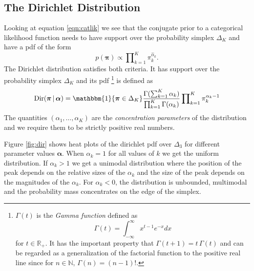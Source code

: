 \documentclass[final,3p,times,twocolumn]{elsarticle}
\DeclareMathOperator*{\Dir}{Dir}
\let\bs\boldsymbol
\begin{document}
\subsection{The Dirichlet Distribution}
\label{sect:dirdistro}
Looking at equation \ref{eqn:catlik} we see that the conjugate prior to a categorical likelihood function needs to have support over the probability simplex $\Delta_K$ and have a pdf of the form 
\begin{equation}
p(\bs \pi) \propto \prod\nolimits_{k=1}^K \pi_k^{\hat\alpha_k}.
\end{equation}
The Dirichlet distribution satisfies both criteria. 
It has support over the probability simplex $\Delta_K$ and its pdf
\footnote{
$\Gamma(t)$ is the \emph{Gamma function} defined as 
\[
\Gamma(t) = \int\nolimits_{-\infty}^{\infty} x^{t-1} e^{-x} dx
\]	
for $t \in \mathbb{R}_+$.
It has the important property that $\Gamma(t+1) = t\,\Gamma(t)$ and can be regarded as a generalization of the factorial function to the positive real line since for $n\in \mathbb{N}$, $\Gamma(n) = (n-1)!$.
}
is defined as
\begin{equation}
\label{eqn:dirpdf}
\Dir(\bs \pi\,|\,\bs \alpha) = \mathbbm{1}\{\bs \pi \in \Delta_K\}\frac{\Gamma(\sum_{k=1}^K\alpha_k)}{\prod_{k=1}^K\Gamma(\alpha_k)}\prod\nolimits_{k=1}^K\pi_k^{\alpha_k - 1} 
\end{equation}
The quantities $(\alpha_1,\dots,\alpha_K)$ are the \emph{concentration parameters} of the distribution and we require them to be strictly positive real numbers. 

Figure \ref{fig:dir} shows heat plots of the dirichlet pdf over $\Delta_3$ for different parameter values $\bs \alpha$.
When $\alpha_k = 1$ for all values of $k$ we get the uniform distribution.
If $\alpha_k  > 1$ we get a unimodal distribution where the position of the peak depends on the relative sizes of the $\alpha_k$ and the size of the peak depends on the magnitudes of the $\alpha_k$.
For $\alpha_k < 0$, the distribution is unbounded, multimodal and the probability mass concentrates on the edge of the simplex.
\end{document}
